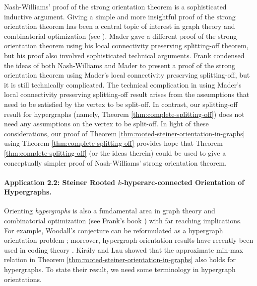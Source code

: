 \begin{remark}
Nash-Williams' proof of the strong orientation theorem \cite{NW60} is a sophisticated inductive argument. Giving a simple and more insightful proof of the strong orientation theorem has been a central topic of interest in graph theory and combinatorial optimization (see \cite{Frank93:Applications-of-submod-functions}). Mader \cite{Mad78} gave a different proof of the strong orientation theorem using his local connectivity preserving splitting-off theorem, but his proof also involved sophisticated technical arguments. Frank \cite{Frank93:Applications-of-submod-functions} condensed the ideas of both Nash-Williams and Mader to present a proof of the strong orientation theorem using Mader's local connectivity preserving splitting-off, but it is still technically complicated. The technical complication in using Mader's local connectivity preserving splitting-off result arises from the assumptions that need to be satisfied by the vertex to be split-off. In contrast, our splitting-off result for hypergraphs (namely, Theorem \ref{thm:complete-splitting-off}) does not need any assumptions on the vertex to be split-off. In light of these considerations, our proof of Theorem \ref{thm:rooted-steiner-orientation-in-graphs} using Theorem \ref{thm:complete-splitting-off} provides hope that Theorem \ref{thm:complete-splitting-off} (or the ideas therein) could be used to give a conceptually simpler proof of Nash-Williams' strong orientation theorem. 
\end{remark}


\paragraph{Application 2.2: Steiner Rooted $k$-hyperarc-connected Orientation of Hypergraphs.}
Orienting \emph{hypergraphs} is also a fundamental area in graph theory and combinatorial optimization (see Frank's book \cite{Frank-book}) 
with far reaching implications. For example, Woodall's conjecture can be reformulated as a hypergraph orientation problem \cite{egres-open-problem-on-head-disjoint-sco}; moreover,  
hypergraph orientation results have recently been used in coding theory \cite{AGL23}.
Kir\'{a}ly and Lau \cite{Kiraly-Lau} showed that the approximate min-max relation in Theorem \ref{thm:rooted-steiner-orientation-in-graphs} also holds for hypergraphs. To state their result, we need some terminology in hypergraph orientations. 

